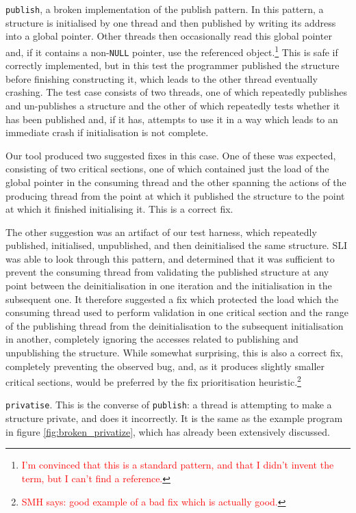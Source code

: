 \documentclass[10pt,twocolumn,preprint,natbib,authoryear]{sigplanconf}
\newcommand{\editorial}[1]{\textcolor{red}{\footnote{\textcolor{red}{#1}}}}
\newcommand{\smh}[1]{\editorial{SMH says: #1}}
\begin{document}
\verb|publish|, a broken implementation of the publish pattern.  In
this pattern, a structure is initialised by one thread and then
published by writing its address into a global pointer.  Other threads
then occasionally read this global pointer and, if it contains a
non-\verb|NULL| pointer, use the referenced object.\editorial{I'm
  convinced that this is a standard pattern, and that I didn't invent
  the term, but I can't find a reference.}  This is safe if correctly
implemented, but in this test the programmer published the structure
before finishing constructing it, which leads to the other thread
eventually crashing.  The test case consists of two threads, one of
which repeatedly publishes and un-publishes a structure and the other
of which repeatedly tests whether it has been published and, if it
has, attempts to use it in a way which leads to an immediate crash if
initialisation is not complete.

Our tool produced two suggested fixes in this case.  One of these was
expected, consisting of two critical sections, one of which contained
just the load of the global pointer in the consuming thread and the
other spanning the actions of the producing thread from the point at
which it published the structure to the point at which it finished
initialising it.  This is a correct fix.

The other suggestion was an artifact of our test harness, which
repeatedly published, initialised, unpublished, and then deinitialised
the same structure.  SLI was able to look through this pattern, and
determined that it was sufficient to prevent the consuming thread from
validating the published structure at any point between the
deinitialisation in one iteration and the initialisation in the
subsequent one.  It therefore suggested a fix which protected the load
which the consuming thread used to perform validation in one critical
section and the range of the publishing thread from the
deinitialisation to the subsequent initialisation in another,
completely ignoring the accesses related to publishing and
unpublishing the structure.  While somewhat surprising, this is also a
correct fix, completely preventing the observed bug, and, as it
produces slightly smaller critical sections, would be preferred by the
fix prioritisation heuristic.\smh{good example of a bad fix which is
  actually good.}

\verb|privatise|.  This is the converse of \verb|publish|: a thread is
attempting to make a structure private, and does it incorrectly.  It
is the same as the example program in figure
\ref{fig:broken_privatize}, which has already been extensively
discussed.
\end{document}
